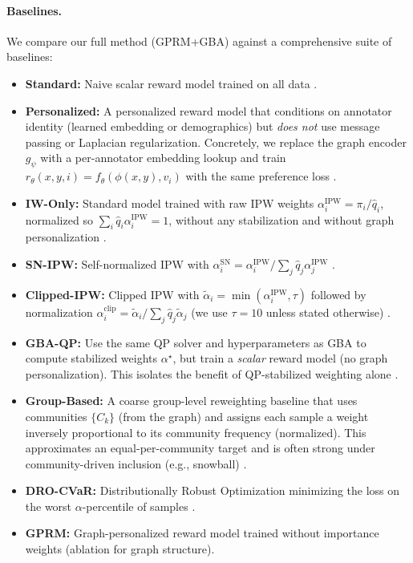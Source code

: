 \documentclass{article}
\theoremstyle{plain}
\theoremstyle{definition}
\theoremstyle{remark}
\begin{document}
\paragraph{Baselines.}
We compare our full method (GPRM+GBA) against a comprehensive suite of baselines:
\begin{itemize}
    \item \textbf{Standard:} Naive scalar reward model trained on all data \citep{stiennon2020summarize,ouyang2022instructgpt}.
    \item \textbf{Personalized:} A personalized reward model that
    conditions on annotator identity (learned embedding or demographics) but
    \emph{does not} use message passing or Laplacian regularization. Concretely,
    we replace the graph encoder $g_\psi$ with a per-annotator embedding lookup
    and train $r_\theta(x,y,i)=f_\theta(\phi(x,y),v_i)$ with the same preference
    loss \citep{li2024personalized_rlhf}.
    \item \textbf{IW-Only:} Standard model trained with raw IPW weights
    $\alpha_i^{\mathrm{IPW}}=\pi_i/\hat q_i$, normalized so
    $\sum_i \hat q_i \alpha_i^{\mathrm{IPW}}=1$, without any stabilization and
    without graph personalization \citep{chandak2021uno}.
    \item \textbf{SN-IPW:} Self-normalized IPW with
    $\alpha_i^{\mathrm{SN}}=\alpha_i^{\mathrm{IPW}}/\sum_j \hat q_j\alpha_j^{\mathrm{IPW}}$ \citep{chandak2021uno}.
    \item \textbf{Clipped-IPW:} Clipped IPW with
    $\tilde\alpha_i=\min(\alpha_i^{\mathrm{IPW}},\tau)$ followed by
    normalization $\alpha_i^{\mathrm{clip}}=\tilde\alpha_i/\sum_j \hat q_j\tilde\alpha_j$
    (we use $\tau=10$ unless stated otherwise) \citep{chandak2021uno}.
    \item \textbf{GBA-QP:} Use the same QP solver and
    hyperparameters as GBA to compute stabilized weights $\alpha^\star$, but
    train a \emph{scalar} reward model (no graph personalization). This isolates
    the benefit of QP-stabilized weighting alone \citep{hainmueller2012entropy}.
    \item \textbf{Group-Based:} A coarse group-level reweighting baseline that
    uses communities $\{C_k\}$ (from the graph) and assigns each sample a weight
    inversely proportional to its community frequency (normalized). This
    approximates an equal-per-community target and is often strong under
    community-driven inclusion (e.g., snowball) \citep{chakraborty2024maxminrlhf,ramesh2024grpo}.
    \item \textbf{DRO-CVaR:} Distributionally Robust Optimization minimizing
    the loss on the worst $\alpha$-percentile of samples \citep{rahimian2022dro}.
    \item \textbf{GPRM:} Graph-personalized reward model trained without
    importance weights (ablation for graph structure).
\end{itemize}
\end{document}
